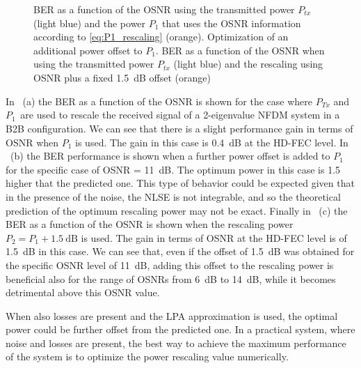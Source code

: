 \begin{figure}[t]

  \centering
  \hfill
  \figuresvspace
  \caption{ \ac{BER} as a function of the \ac{OSNR} using the transmitted power $P_{tx}$ (light blue) and the power $P_1$ that uses the \ac{OSNR} information according to \eqref{eq:P1_rescaling} (orange).  Optimization of an additional power offset to $P_1$.  \ac{BER} as a function of the \ac{OSNR} when using the transmitted power $P_{tx}$ (light blue) and the  rescaling using \ac{OSNR} plus a fixed \SI{1.5}{\dB} offset (orange)}
  \label{fig:rx_power_offset}
\end{figure}

In ~(a) the \ac{BER} as a function of the \ac{OSNR} is shown for the case where
 $P_{Tx}$ and $P_1\frac{}{}$ are used to rescale the
received signal of a 2-eigenvalue \ac{NFDM} system in a B2B configuration. We
can see that there is a slight performance gain in terms of \ac{OSNR} when $P_1$ is used. The gain in this
case is \SI{0.4}{\dB} at the \ac{HD-FEC} level.
In ~(b) the \ac{BER} performance is shown when a further
power offset is added to $P_1$ for the specific case of \ac{OSNR} = \SI{11}{dB}. The optimum power in this case is \SI{1.5}{\dBm}
higher that the predicted one. This type of behavior could be expected given that
in the presence of the noise, the \ac{NLSE} is not integrable, and so the theoretical
prediction of the optimum rescaling power may not be exact. Finally in ~(c) the \ac{BER} as a function of the \ac{OSNR}
is shown when the rescaling power $P_2 = P_1 + \SI{1.5}{\dB}$ is used. The gain in terms of \ac{OSNR} at the \ac{HD-FEC} level is of \SI{1.5}{\dB} in this case. We can see that, even if the offset of \SI{1.5}{\dB} was obtained for the specific  \ac{OSNR} level of \SI{11}{dB}, adding this offset to the rescaling power is beneficial also for the range of \acp{OSNR} from \SI{6}{\dB} to \SI{14}{\dB}, while it becomes detrimental above this \ac{OSNR} value.

When also losses
are present and the \ac{LPA} approximation is used, the optimal power could be
further offset from the predicted one. In a practical system, where noise and
losses are present, the best way to achieve the maximum performance of the
system is to optimize the power rescaling value numerically.


